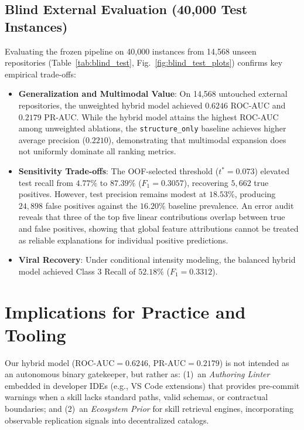 \documentclass[10pt,conference]{IEEEtran}
\begin{document}
\subsection{Blind External Evaluation (40,000 Test Instances)}
Evaluating the frozen pipeline on 40,000 instances from 14,568 unseen repositories (Table~\ref{tab:blind_test}, Fig.~\ref{fig:blind_test_plots}) confirms key empirical trade-offs:
\begin{itemize}
    \item \textbf{Generalization and Multimodal Value}: On 14,568 untouched external repositories, the unweighted hybrid model achieved $\mathbf{0.6246}$ ROC-AUC and $\mathbf{0.2179}$ PR-AUC. While the hybrid model attains the highest ROC-AUC among unweighted ablations, the \texttt{structure\_only} baseline achieves higher average precision ($0.2210$), demonstrating that multimodal expansion does not uniformly dominate all ranking metrics.
    \item \textbf{Sensitivity Trade-offs}: The OOF-selected threshold ($t^* = 0.073$) elevated test recall from $4.77\%$ to $\mathbf{87.39\%}$ ($F_1 = 0.3057$), recovering $5,662$ true positives. However, test precision remains modest at $18.53\%$, producing $24,898$ false positives against the $16.20\%$ baseline prevalence. An error audit reveals that three of the top five linear contributions overlap between true and false positives, showing that global feature attributions cannot be treated as reliable explanations for individual positive predictions.
    \item \textbf{Viral Recovery}: Under conditional intensity modeling, the balanced hybrid model achieved Class 3 Recall of $\mathbf{52.18\%}$ ($F_1 = 0.3312$).
\end{itemize}

\section{Implications for Practice and Tooling}
Our hybrid model ($\text{ROC-AUC}=0.6246$, $\text{PR-AUC}=0.2179$) is not intended as an autonomous binary gatekeeper, but rather as: (1)~an \emph{Authoring Linter} embedded in developer IDEs (e.g., VS Code extensions) that provides pre-commit warnings when a skill lacks standard paths, valid schemas, or contractual boundaries; and (2)~an \emph{Ecosystem Prior} for skill retrieval engines, incorporating observable replication signals into decentralized catalogs.
\end{document}
